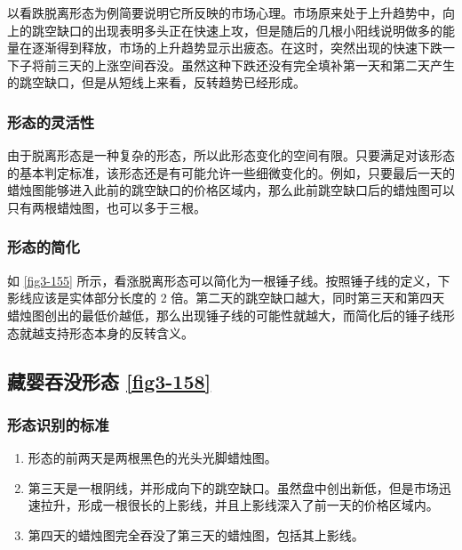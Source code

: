 以看跌脱离形态为例简要说明它所反映的市场心理。市场原来处于上升趋势中，向上的跳空缺口的出现表明多头正在快速上攻，但是随后的几根小阳线说明做多的能量在逐渐得到释放，市场的上升趋势显示出疲态。在这时，突然出现的快速下跌一下子将前三天的上涨空间吞没。虽然这种下跌还没有完全填补第一天和第二天产生的跳空缺口，但是从短线上来看，反转趋势已经形成。

\subsubsection*{形态的灵活性}
由于脱离形态是一种复杂的形态，所以此形态变化的空间有限。只要满足对该形态的基本判定标准，该形态还是有可能允许一些细微变化的。例如，只要最后一天的蜡烛图能够进入此前的跳空缺口的价格区域内，那么此前跳空缺口后的蜡烛图可以只有两根蜡烛图，也可以多于三根。

\subsubsection*{形态的简化}
如 \autoref{fig3-155} 所示，看涨脱离形态可以简化为一根锤子线。按照锤子线的定义，下影线应该是实体部分长度的 2 倍。第二天的跳空缺口越大，同时第三天和第四天蜡烛图创出的最低价越低，那么出现锤子线的可能性就越大，而简化后的锤子线形态就越支持形态本身的反转含义。
\subsection{藏婴吞没形态 \autoref{fig3-158}}
\subsubsection*{形态识别的标准}
\begin{enumerate}
    \item 形态的前两天是两根黑色的光头光脚蜡烛图。
    \item 第三天是一根阴线，并形成向下的跳空缺口。虽然盘中创出新低，但是市场迅速拉升，形成一根很长的上影线，并且上影线深入了前一天的价格区域内。
    \item 第四天的蜡烛图完全吞没了第三天的蜡烛图，包括其上影线。
\end{enumerate}

